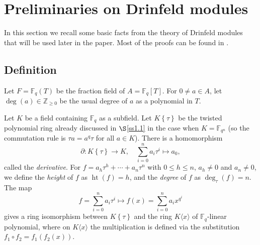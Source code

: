 \documentclass[12pt]{amsart}
\theoremstyle{definition}
\theoremstyle{remark}
\numberwithin{equation}{section}
\numberwithin{thm}{section}
\DeclareMathOperator{\Ht}{ht}
\DeclareMathOperator{\chr}{char}
\DeclareMathOperator{\ord}{ord}
\newcommand{\fp}{\mathfrak{p}}
\newcommand{\F}{\mathbb{F}}
\newcommand{\Z}{\mathbb{Z}}
\newcommand{\twist}[1]{#1\!\left\{\tau\right\}}
\newcommand{\atwist}[2]{#1\langle#2\rangle}
\newcommand{\abs}[1]{\left|#1\right|}
\begin{document}

\section{Preliminaries on Drinfeld modules}\label{sDM}  In this section we recall some basic facts 
from the theory of Drinfeld modules that will be used later in the paper. Most of the proofs can be found in \cite{PapikianGTM}. 

\subsection{Definition} Let $F=\F_q(T)$ be the fraction field of $A=\F_q[T]$. For $0\neq a\in A$, let $\deg(a)\in \Z_{\geq 0}$ be the usual degree 
of $a$ as a polynomial in $T$. 

Let $K$ be a field containing $\F_q$ as a subfield. Let 
$\twist{K}$ be the twisted polynomial ring already discussed in $\S$\ref{ss1.1} in the case when $K=\F_{q^n}$ (so the commutation rule is $\tau a=a^q\tau$ for all $a\in K$). 
There is a homomorphism \[ \partial\colon \twist{K}\to K, \quad \sum_{i=0}^n a_i \tau^i \mapsto a_0,\] called the \textit{derivative}. 
For $f=a_h\tau^h+\cdots +a_n\tau^n$ with $0\leq h\leq n$, $a_h\neq 0$ and $a_n\neq 0$, we define the \textit{height} of $f$ as $\Ht(f)=h$, and the \textit{degree} of $f$ as $\deg_\tau(f)=n$. 
The map $$f=\sum_{i=0}^n a_i \tau^i \longmapsto f(x)=\sum_{i=0}^n a_i x^{q^i}$$ gives a ring isomorphism between $\twist{K}$ 
and the ring $\atwist{K}{x}$ of $\F_q$-linear polynomial, where on $\atwist{K}{x}$ the multiplication is defined via the substitution $f_1\circ f_2=f_1(f_2(x))$. 

\end{document}
